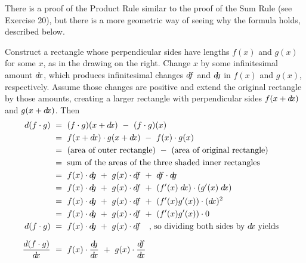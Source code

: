 There is a proof of the Product Rule similar to the proof of the Sum Rule (see
Exercise 20), but there is a more geometric way of seeing why the formula holds,
described below.

Construct a rectangle whose perpendicular sides have lengths $f(x)$ and $g(x)$
for some $x$, as in the drawing on the right. Change $x$ by some
infinitesimal amount $d\!x$, which produces infinitesimal changes $d\negmedspace f$ and $d\negmedspace g$
in $f(x)$ and $g(x)$, respectively. Assume those changes are positive and extend
the original rectangle by those amounts, creating a larger rectangle with
perpendicular sides $f(x + d\!x)$ and $g(x + d\!x)$. Then
\begin{align*}
d(f \cdot g) ~&=~ (f \cdot g)(x + \dx) ~-~ (f \cdot g)(x)\\
&=~ f(x + \dx) \cdot g(x + \dx) ~-~ f(x) \cdot g(x) &\\
&=~ \text{(area of outer rectangle)} ~-~ \text{(area of original rectangle)}\\
&=~ \text{sum of the areas of the three shaded inner rectangles}\\
&=~ f(x) \cdot \dg ~+~ g(x) \cdot \df ~+~ \df \cdot \dg\\
&=~ f(x) \cdot \dg ~+~ g(x) \cdot \df ~+~ (f'(x)\;\dx) \cdot (g'(x)\;\dx)\\
&=~ f(x) \cdot \dg ~+~ g(x) \cdot \df ~+~ (f'(x) g'(x)) \cdot (\dx)^2\\
&=~ f(x) \cdot \dg ~+~ g(x) \cdot \df ~+~ (f'(x) g'(x)) \cdot 0\\
d(f \cdot g) ~&=~  f(x) \cdot \dg ~+~ g(x) \cdot \df \quad\text{, so dividing both sides by $\dx$ yields}\\[6pt]
\frac{d(f \cdot g)}{\dx} ~&=~ f(x) \cdot \dgdx ~+~ g(x) \cdot \dfdx \quad \checkmark
\end{align*}

